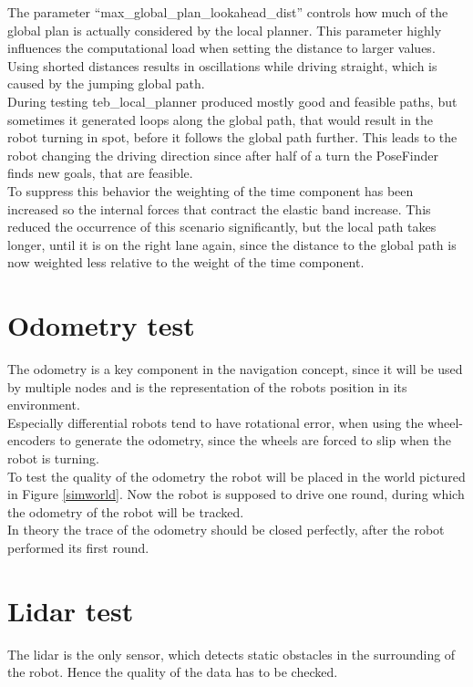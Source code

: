 The parameter ``max\_global\_plan\_lookahead\_dist'' controls how much of the global plan is actually considered by the local planner. This parameter highly influences the computational load when setting the distance to larger values. Using shorted distances results in oscillations while driving straight, which is caused by the jumping global path.\\

During testing teb\_local\_planner produced mostly good and feasible paths, but sometimes it generated loops along the global path, that would result in the robot turning in spot, before it follows the global path further. This leads to the robot changing the driving direction since after half of a turn the PoseFinder finds new goals, that are feasible.\\

To suppress this behavior the weighting of the time component has been increased so the internal forces that contract the elastic band increase. This reduced the occurrence of this scenario significantly, but the local path takes longer, until it is on the right lane again, since the distance to the global path is now weighted less relative to the weight of the time component.

\section{Odometry test}
The odometry is a key component in the navigation concept, since it will be used by multiple nodes and is the representation of the robots position in its environment.\\

Especially differential robots tend to have rotational error, when using the wheel-encoders to generate the odometry, since the wheels are forced to slip when the robot is turning.\\

To test the quality of the odometry the robot will be placed in the world pictured in Figure \ref{simworld}. Now the robot is supposed to drive one round, during which the odometry of the robot will be tracked.\\

In theory the trace of the odometry should be closed perfectly, after the robot performed its first round.\\

\section{Lidar test}
The lidar is the only sensor, which detects static obstacles in the surrounding of the robot. Hence the quality of the data has to be checked.

